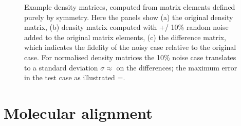 \documentclass[letterpaper,table,10pt,english]{jupyterBook}
\begin{document}
\begin{figure}[htbp]
\centering
\capstart

\noindent{}
\caption{Example density matrices, computed from matrix elements defined purely by  symmetry. Here the panels show (a) the original density matrix, (b) density matrix computed with +/\sphinxhyphen{} 10\% random noise added to the original matrix elements, (c) the difference matrix, which indicates the fidelity of the noisy case relative to the original case. For normalised density matrices the 10\% noise case translates to a standard deviation \(\sigma\approx\) on the differences; the maximum error in the test case as illustrated =.}\label{\detokenize{part1/theory_density_matrices_190723-noQutip:fig-denmatd2hcompexample}}\end{figure}

\sphinxstepscope


\section{Molecular alignment}
\label{\detokenize{part1/theory_molecular_alignment_170723:molecular-alignment}}\label{\detokenize{part1/theory_molecular_alignment_170723:sect-theory-alignment}}\label{\detokenize{part1/theory_molecular_alignment_170723::doc}}
\end{document}
